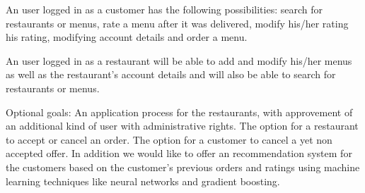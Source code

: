 An user logged in as a customer has the following possibilities: search
for restaurants or menus, rate a menu after it was
delivered, modify his/her rating his rating, modifying account details and
order a menu.

An user logged in as a restaurant will be able to add and modify 
his/her menus as well as the restaurant's account details 
and will also be able to search for restaurants or menus.

Optional goals: An application process for the restaurants, with 
approvement of an additional kind of user with administrative rights.
The option for a restaurant to accept or cancel an order.
The option for a customer to cancel a yet non accepted offer.
In addition we would like to offer an recommendation system for the customers based on the customer's
previous orders and ratings using machine learning techniques like neural networks
and gradient boosting.
